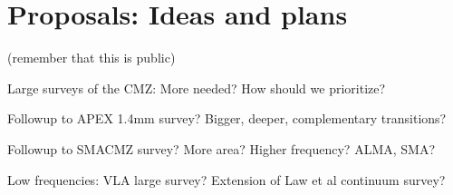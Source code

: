\section{Proposals: Ideas and plans}
(remember that this is public)

Large surveys of the CMZ: More needed?  How should we prioritize?

Followup to APEX 1.4mm survey?  Bigger, deeper, complementary transitions?

Followup to SMACMZ survey?  More area?  Higher frequency?  ALMA, SMA?

Low frequencies: VLA large survey?  Extension of Law et al continuum survey?